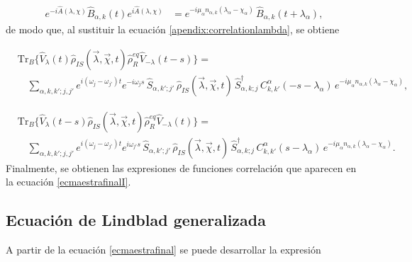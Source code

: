 \begin{appendixs}
\begin{align}
    e^{-i\hat{A}(\lambda,\chi)} \hat{B}_{\alpha,k}(t)e^{i\hat{A}(\lambda,\chi)} 
    &= e^{-i\mu_{\alpha}n_{\alpha,k}(\lambda_{\alpha}-\chi_{\alpha})}\, \hat{B}_{\alpha,k}(t+\lambda_{\alpha}), 
    \label{apendix:correlationlambda}
\end{align}
de modo que, al sustituir la ecuación \eqref{apendix:correlationlambda}, se obtiene  

\begin{align*}
 & \mathrm{Tr}_{B}\{ \hat{V}_{\lambda}(t)\hat{\rho}_{IS}(\vec{\lambda},\vec{\chi},t)\hat{\rho}_{R}^{eq}\hat{V}_{-\lambda}(t-s) \} = \\
 & \quad \sum_{\alpha,k,k';j,j'} e^{i(\omega_{j}-\omega_{j'})t} e^{-i\omega_{j}s}\, 
 \hat{S}_{\alpha,k';j'}\, \hat{\rho}_{IS}(\vec{\lambda},\vec{\chi},t)\, \hat{S}^{\dagger}_{\alpha,k;j}\,
 C^{\alpha}_{k,k'}(-s-\lambda_{\alpha})\, e^{-i\mu_{\alpha}n_{\alpha,k}(\lambda_{\alpha}-\chi_{\alpha})},
 \end{align*}

 \begin{align*}
    & \mathrm{Tr}_{B}\{ \hat{V}_{\lambda}(t-s)\hat{\rho}_{IS}(\vec{\lambda},\vec{\chi},t)\hat{\rho}_{R}^{eq}\hat{V}_{-\lambda}(t) \} = \\
    & \quad \sum_{\alpha,k,k';j,j'} e^{i(\omega_{j}-\omega_{j'})t} e^{i\omega_{j'}s}\, 
    \hat{S}_{\alpha,k';j'}\, \hat{\rho}_{IS}(\vec{\lambda},\vec{\chi},t)\, \hat{S}^{\dagger}_{\alpha,k;j}\,
    C^{\alpha}_{k,k'}(s-\lambda_{\alpha})\, e^{-i\mu_{\alpha}n_{\alpha,k}(\lambda_{\alpha}-\chi_{\alpha})}.
 \end{align*}
Finalmente, se obtienen las expresiones de funciones correlación que aparecen en la ecuación \eqref{ecmaestrafinalI}.
\label{finalequation}


\subsection{Ecuación de Lindblad generalizada}

A partir de la ecuación \eqref{ecmaestrafinal} se puede desarrollar la expresión


\end{appendixs}
